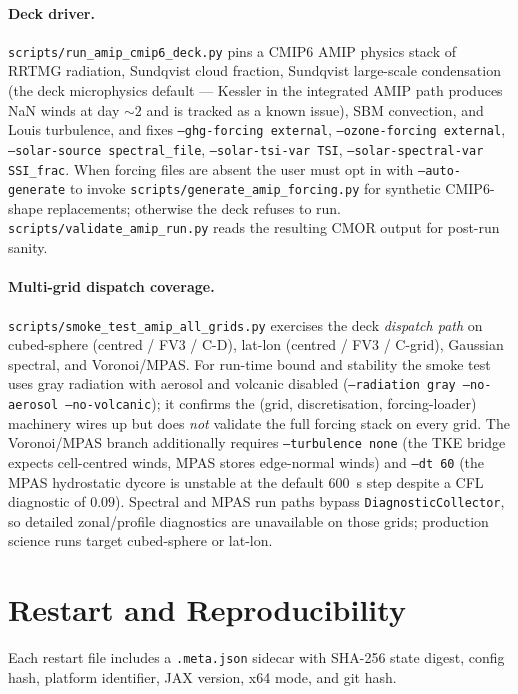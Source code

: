 \documentclass[11pt,twoside]{report}
\begin{document}
\paragraph{Deck driver.}
\texttt{scripts/run\_amip\_cmip6\_deck.py} pins a CMIP6 AMIP physics
stack of RRTMG radiation, Sundqvist cloud fraction, Sundqvist
large-scale condensation (the deck microphysics default --- Kessler
in the integrated AMIP path produces NaN winds at day ${\sim}2$ and
is tracked as a known issue), SBM convection, and Louis turbulence,
and fixes \texttt{--ghg-forcing external}, \texttt{--ozone-forcing external},
\texttt{--solar-source spectral\_file}, \texttt{--solar-tsi-var TSI},
\texttt{--solar-spectral-var SSI\_frac}.  When forcing files are
absent the user must opt in with \texttt{--auto-generate} to invoke
\texttt{scripts/generate\_amip\_forcing.py} for synthetic CMIP6-shape
replacements; otherwise the deck refuses to run.
\texttt{scripts/validate\_amip\_run.py} reads the resulting CMOR
output for post-run sanity.

\paragraph{Multi-grid dispatch coverage.}
\texttt{scripts/smoke\_test\_amip\_all\_grids.py} exercises the deck
\emph{dispatch path} on cubed-sphere (centred / FV3 / C-D), lat-lon
(centred / FV3 / C-grid), Gaussian spectral, and Voronoi/MPAS.
For run-time bound and stability the smoke test uses gray radiation
with aerosol and volcanic disabled (\texttt{--radiation gray
--no-aerosol --no-volcanic}); it confirms the (grid, discretisation,
forcing-loader) machinery wires up but does \emph{not} validate the
full forcing stack on every grid.  The Voronoi/MPAS branch
additionally requires \texttt{--turbulence none} (the TKE bridge
expects cell-centred winds, MPAS stores edge-normal winds) and
\texttt{--dt 60} (the MPAS hydrostatic dycore is unstable at the
default $600$~s step despite a CFL diagnostic of $0.09$).  Spectral
and MPAS run paths bypass \texttt{DiagnosticCollector}, so detailed
zonal/profile diagnostics are unavailable on those grids; production
science runs target cubed-sphere or lat-lon.

\section{Restart and Reproducibility}

Each restart file includes a \texttt{.meta.json} sidecar with SHA-256
state digest, config hash, platform identifier, JAX version, x64 mode,
and git hash.
\end{document}

